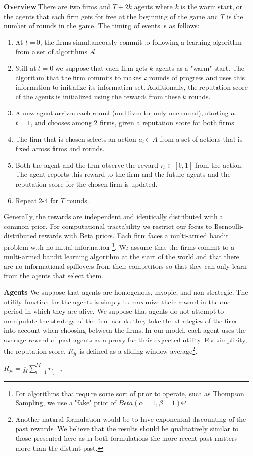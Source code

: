 \documentclass{article}
\theoremstyle{definition}
\begin{document}
\textbf{Overview} There are two firms and $T+2k$ agents where $k$ is the warm start, or the agents that each firm gets for free at the beginning of the game and $T$ is the number of rounds in the game. The timing of events is as follows:
\begin{enumerate}
\item At $t = 0$, the firms simultaneously commit to following a learning algorithm from a set of algorithms $\mathcal{A}$
\item Still at $t = 0$ we suppose that each firm gets $k$ agents as a "warm" start. The algorithm that the firm commits to makes $k$ rounds of progress and uses this information to initialize its information set. Additionally, the reputation score of the agents is initialized using the rewards from these $k$ rounds.
\item A new agent arrives each round (and lives for only one round), starting at $t = 1$, and chooses among 2 firms, given a reputation score for both firms.
\item The firm that is chosen selects an action $a_{t} \in A$ from a set of actions that is fixed across firms and rounds.
\item Both the agent and the firm observe the reward $r_t \in [0, 1]$ from the action. The agent reports this reward to the firm and the future agents and the reputation score for the chosen firm is updated.
\item Repeat 2-4 for $T$ rounds.
\end{enumerate}

Generally, the rewards are independent and identically distributed with a common prior.  For computational tractability we restrict our focus to Bernoulli-distributed rewards with Beta priors. Each firm faces a multi-armed bandit problem with no initial information \footnote{For algorithms that require some sort of prior to operate, such as Thompson Sampling, we use a "fake" prior of $Beta(\alpha=1,\beta=1)$}. We assume that the firms commit to a multi-armed bandit learning algorithm at the start of the world and that there are no informational spillovers from their competitors so that they can only learn from the agents that select them.

\noindent \textbf{Agents} We suppose that agents are homogenous, myopic, and non-strategic. The utility function for the agents is simply to maximize their reward in the one period in which they are alive. We suppose that agents do not attempt to manipulate the strategy of the firm nor do they take the strategies of the firm into account when choosing between the firms. In our model, each agent uses the average reward of past agents as a proxy for their expected utility. For simplicity, the reputation score, $R_{jt}$ is defined as a sliding window average\footnote{Another natural formulation would be to have exponential discounting of the past rewards. We believe that the results should be qualitatively similar to those presented here as in both formulations the more recent past matters more than the distant past.}.
\begin{center}
$R_{jt} = \frac{1}{M} \sum\limits_{i=1}^{M} r_{t_j-i}$
\end{center}
\end{document}
